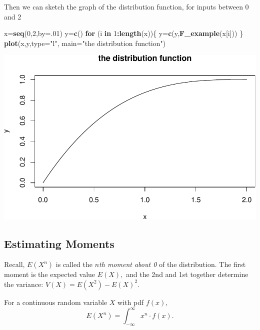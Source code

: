 \documentclass[
]{book}
\newenvironment{Shaded}{\begin{snugshade}}{\end{snugshade}}
\newcommand{\AttributeTok}[1]{\textcolor[rgb]{0.13,0.29,0.53}{#1}}
\newcommand{\ControlFlowTok}[1]{\textcolor[rgb]{0.13,0.29,0.53}{\textbf{#1}}}
\newcommand{\DecValTok}[1]{\textcolor[rgb]{0.00,0.00,0.81}{#1}}
\newcommand{\FunctionTok}[1]{\textcolor[rgb]{0.13,0.29,0.53}{\textbf{#1}}}
\newcommand{\NormalTok}[1]{#1}
\newcommand{\OtherTok}[1]{\textcolor[rgb]{0.56,0.35,0.01}{#1}}
\newcommand{\SpecialCharTok}[1]{\textcolor[rgb]{0.81,0.36,0.00}{\textbf{#1}}}
\newcommand{\StringTok}[1]{\textcolor[rgb]{0.31,0.60,0.02}{#1}}
\theoremstyle{definition}
\theoremstyle{definition}
\theoremstyle{definition}
\theoremstyle{definition}
\theoremstyle{remark}
\begin{document}
Then we can sketch the graph of the distribution function, for inputs between 0 and 2

\begin{Shaded}
\begin{Highlighting}[]
\NormalTok{x}\OtherTok{=}\FunctionTok{seq}\NormalTok{(}\DecValTok{0}\NormalTok{,}\DecValTok{2}\NormalTok{,}\AttributeTok{by=}\NormalTok{.}\DecValTok{01}\NormalTok{)}
\NormalTok{y}\OtherTok{=}\FunctionTok{c}\NormalTok{()}
\ControlFlowTok{for}\NormalTok{ (i }\ControlFlowTok{in} \DecValTok{1}\SpecialCharTok{:}\FunctionTok{length}\NormalTok{(x))\{}
\NormalTok{  y}\OtherTok{=}\FunctionTok{c}\NormalTok{(y,}\FunctionTok{F\_example}\NormalTok{(x[i]))}
\NormalTok{\}}
\FunctionTok{plot}\NormalTok{(x,y,}\AttributeTok{type=}\StringTok{"l"}\NormalTok{,}
     \AttributeTok{main=}\StringTok{"the distribution function"}\NormalTok{)}
\end{Highlighting}
\end{Shaded}

\includegraphics{math340-notes_files/figure-latex/plot distn fcn-1.pdf}

\subsection*{Estimating Moments}\label{estimating-moments}

Recall, \(E(X^n)\) is called the \emph{\(n\)th moment about 0} of the distribution. The first moment is the expected value \(E(X),\) and the 2nd and 1st together determine the variance: \(V(X) = E(X^2)-E(X)^2.\)

For a continuous random variable \(X\) with pdf \(f(x),\) \[E(X^n) = \int_{-\infty}^\infty x^n \cdot f(x).\]
\end{document}
